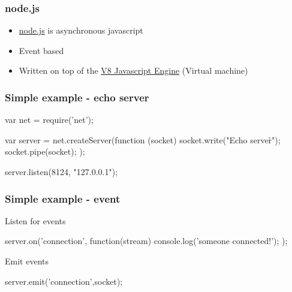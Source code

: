 \documentclass{beamer}
\begin{document}
\begin{frame}[fragile]
    \frametitle{node.js}
    \begin{itemize}
    \item \href{http://nodejs.org/}{node.js} is asynchronous javascript
    \item Event based
    \item Written on top of the \href{http://code.google.com/p/v8/}{V8 Javascript Engine} (Virtual machine)
    \end{itemize}
\end{frame}

\begin{frame}[fragile]
    \frametitle{Simple example - echo server}
    \begin{javascriptcode}
        var net = require('net');

        var server = net.createServer(function (socket) {
            socket.write("Echo server\r\n");
            socket.pipe(socket);
        });

        server.listen(8124, "127.0.0.1");
    \end{javascriptcode}
\end{frame}

\begin{frame}[fragile]
    \frametitle{Simple example - event}
    Listen for events
    \begin{javascriptcode}
        server.on('connection', function(stream) {
            console.log('someone connected!');
        });
    \end{javascriptcode}
    Emit events
    \begin{javascriptcode}
        server.emit('connection',socket);
    \end{javascriptcode}
\end{frame}
\end{document}
